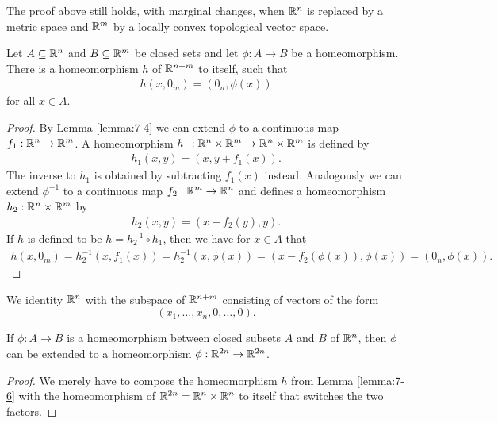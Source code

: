 \begin{remark}\label{remark:7-5}
  The proof above still holds, with marginal changes, when ${\mathbb{R}}^n$ is
  replaced by a metric space and ${\mathbb{R}}^m$ by a locally convex topological vector space.
\end{remark}

\begin{lemma}\label{lemma:7-6}
  Let $A\subseteq{\ensuremath{\mathbb{R}}}^n$ and $B\subseteq{\ensuremath{\mathbb{R}}}^m$ be closed sets and let $\phi:A\to B$ be a 
  homeomorphism. There is a homeomorphism $h$ of ${\mathbb{R}}^{n+m}$ to itself, such that 
  \begin{align*}
    h(x, 0_m) = (0_n, \phi(x))
  \end{align*}
  for all $x\in A$.
\end{lemma}

\begin{proof}
  By Lemma \ref{lemma:7-4} we can extend $\phi$ to a continuous map $f_1:{\mathbb{R}}^n\to{\ensuremath{\mathbb{R}}}^m$. A 
  homeomorphism $h_1:{\mathbb{R}}^n\times{\ensuremath{\mathbb{R}}}^m\to{\ensuremath{\mathbb{R}}}^n\times{\ensuremath{\mathbb{R}}}^m$ is defined by 
  \begin{align*}
    h_1(x, y) = (x, y+f_1(x)).
  \end{align*} 
  The inverse to $h_1$ is obtained by subtracting $f_1(x)$ instead. Analogously we can 
  extend $\phi^{-1}$ to a continuous map $f_2:{\mathbb{R}}^m\to{\ensuremath{\mathbb{R}}}^n$ and defines a homeomorphism
  $h_2:{\mathbb{R}}^n\times{\ensuremath{\mathbb{R}}}^m$ by 
  \begin{align*}
    h_2(x, y) = (x+f_2(y), y).
  \end{align*}
  If $h$ is defined to be $h=h_2^{-1}\circ h_1$, then we have for $x\in A$ that 
  \begin{align*}
    h(x, 0_m) 
    = h_2^{-1}(x, f_1(x))
    = h_2^{-1}(x, \phi(x))
    = (x-f_2(\phi(x)), \phi(x))
    = (0_n,  \phi(x)).
  \end{align*}
\end{proof}

We identity ${\mathbb{R}}^n$ with the subspace of ${\mathbb{R}}^{n+m}$ consisting of vectors of the form 
\[(x_1, \ldots, x_n, 0, \ldots, 0).\]

\begin{corollary}\label{corollary:7-7}
  If $\phi:A\to B$ is a homeomorphism between closed subsets $A$ and $B$
  of ${\mathbb{R}}^n$, then $\phi$ can be extended to a homeomorphism $\phi:{\mathbb{R}}^{2n}\to{\ensuremath{\mathbb{R}}}^{2n}$.
\end{corollary}

\begin{proof}
  We merely have to compose the homeomorphism $h$ from Lemma \ref{lemma:7-6} with
the homeomorphism of ${\mathbb{R}}^{2n} = {\mathbb{R}}^n\times{\ensuremath{\mathbb{R}}}^n$ to itself that switches the two 
factors.
\end{proof}

